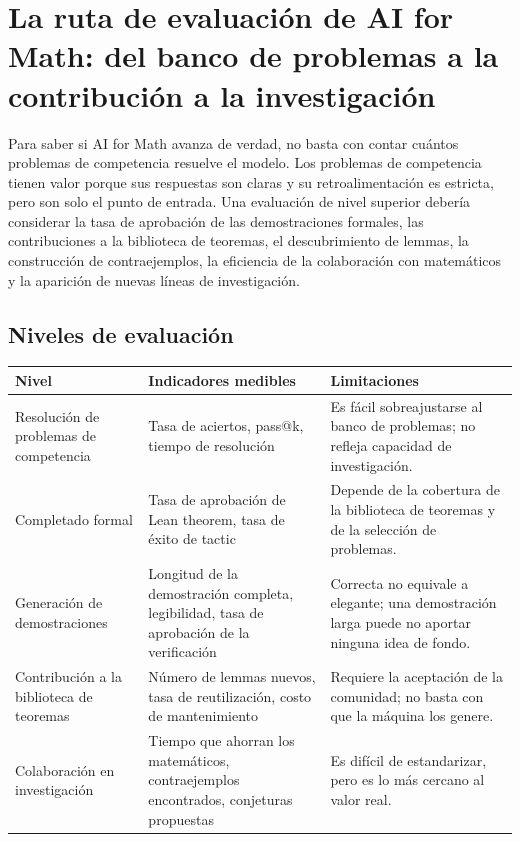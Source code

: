 \section{La ruta de evaluación de AI for Math: del banco de problemas a la contribución a la investigación}

Para saber si AI for Math avanza de verdad, no basta con contar cuántos problemas de competencia resuelve el modelo. Los problemas de competencia tienen valor porque sus respuestas son claras y su retroalimentación es estricta, pero son solo el punto de entrada. Una evaluación de nivel superior debería considerar la tasa de aprobación de las demostraciones formales, las contribuciones a la biblioteca de teoremas, el descubrimiento de lemmas, la construcción de contraejemplos, la eficiencia de la colaboración con matemáticos y la aparición de nuevas líneas de investigación.

\subsection{Niveles de evaluación}

\noindent\begin{longtable}{p{}p{}p{}}
\toprule
Nivel & Indicadores medibles & Limitaciones \\
\midrule
Resolución de problemas de competencia & Tasa de aciertos, pass@k, tiempo de resolución & Es fácil sobreajustarse al banco de problemas; no refleja capacidad de investigación. \\
Completado formal & Tasa de aprobación de Lean theorem, tasa de éxito de tactic & Depende de la cobertura de la biblioteca de teoremas y de la selección de problemas. \\
Generación de demostraciones & Longitud de la demostración completa, legibilidad, tasa de aprobación de la verificación & Correcta no equivale a elegante; una demostración larga puede no aportar ninguna idea de fondo. \\
Contribución a la biblioteca de teoremas & Número de lemmas nuevos, tasa de reutilización, costo de mantenimiento & Requiere la aceptación de la comunidad; no basta con que la máquina los genere. \\
Colaboración en investigación & Tiempo que ahorran los matemáticos, contraejemplos encontrados, conjeturas propuestas & Es difícil de estandarizar, pero es lo más cercano al valor real. \\
\bottomrule
\end{longtable}

